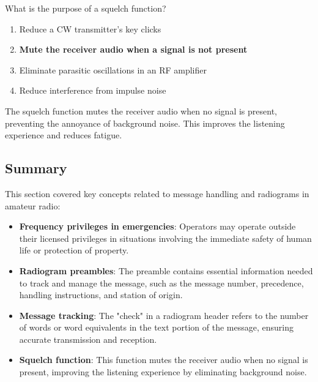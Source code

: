 
\begin{tcolorbox}[colback=gray!10!white,colframe=black!75!black,title={T2B13}]
    What is the purpose of a squelch function?
    \begin{enumerate}[label=\Alph*),noitemsep]
        \item Reduce a CW transmitter's key clicks
        \item \textbf{Mute the receiver audio when a signal is not present}
        \item Eliminate parasitic oscillations in an RF amplifier
        \item Reduce interference from impulse noise
    \end{enumerate}
\end{tcolorbox}

The squelch function mutes the receiver audio when no signal is present, preventing the annoyance of background noise. This improves the listening experience and reduces fatigue.


\subsection*{Summary}

This section covered key concepts related to message handling and radiograms in amateur radio:

\begin{itemize}
    \item \textbf{Frequency privileges in emergencies}: Operators may operate outside their licensed privileges in situations involving the immediate safety of human life or protection of property.
    \item \textbf{Radiogram preambles}: The preamble contains essential information needed to track and manage the message, such as the message number, precedence, handling instructions, and station of origin.
    \item \textbf{Message tracking}: The "check" in a radiogram header refers to the number of words or word equivalents in the text portion of the message, ensuring accurate transmission and reception.
    \item \textbf{Squelch function}: This function mutes the receiver audio when no signal is present, improving the listening experience by eliminating background noise.
\end{itemize}

